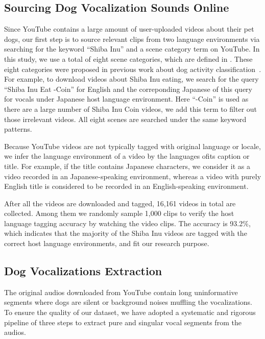 \subsection{Sourcing Dog Vocalization Sounds Online}
\label{sec:source}
Since YouTube contains a large amount of user-uploaded videos about their pet dogs, our first step is to source relevant clips from two language environments via searching for the keyword
``Shiba Inu'' and a scene category term on YouTube. In this study, we use a total of eight scene
categories, which are defined in . These eight categories were proposed
in previous work about dog activity classification~\cite{larranaga2015comparing}. 
For example, to download videos about Shiba Inu eating, we search for
the query ``Shiba Inu Eat -Coin'' for English and the correponding Japanese of this query for vocals under Japanese host language environment. Here ``-Coin'' is used as there are a large number of Shiba Inu Coin videos, we add this term to filter out those irrelevant videos. All eight scenes are searched under the same keyword patterns.

Because YouTube videos are not typically tagged with original language or locale, we infer the language environment of a video by the languages ofits caption or title. For example, if the title contains Japanese characters, we consider it as a video recorded in an Japanese-speaking environment, whereas a video with purely English title is considered to be recorded in an English-speaking environment. 

After all the videos are downloaded and tagged, 16,161 videos in total are collected. Among them we randomly sample 1,000 clips to verify the host language tagging accuracy by watching the video clips. The accuracy is 93.2\%, which indicates that the majority of the Shiba Inu videos are tagged with the correct host language environments, and fit our research purpose.




\subsection{Dog Vocalizations Extraction}
\label{sec:barkextraction}
The original audios downloaded from YouTube contain long uninformative segments where dogs are silent or background noises muffling the vocalizations. To ensure the quality of 
our dataset, we have adopted a systematic and rigorous pipeline of three steps 
to extract pure and singular vocal segments from the audios.


